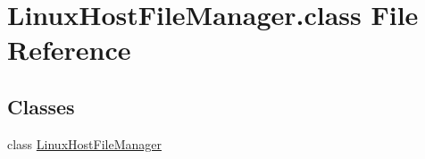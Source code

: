\hypertarget{LinuxHostFileManager_8class}{\section{Linux\-Host\-File\-Manager.\-class File Reference}
\label{LinuxHostFileManager_8class}
}
\subsection*{Classes}
\begin{DoxyCompactItemize}
\item 
class \hyperlink{classLinuxHostFileManager}{Linux\-Host\-File\-Manager}
\end{DoxyCompactItemize}
